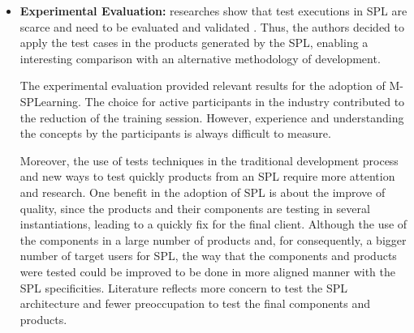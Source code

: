\begin{itemize}
\item \textbf{Experimental Evaluation:} researches show that test executions in SPL are scarce and need to be evaluated and validated \cite{engstrom11}. Thus, the authors decided to apply the test cases in the products generated by the SPL, enabling a interesting comparison with an alternative methodology of development.

The experimental evaluation provided relevant results for the adoption of M-SPLear\allowbreak ning. The choice for active participants in the industry contributed to the reduction of the training session. However, experience and understanding the concepts by the participants is always difficult to measure.

Moreover, the use of tests techniques in the traditional development process and new ways to test quickly products from an SPL require more attention and research. One benefit in the adoption of SPL is about the improve of quality, since the products and their components are testing in several instantiations, leading to a quickly fix for the final client. Although the use of the components in a large number of products and, for consequently, a bigger number of target users for SPL, the way that the components and products were tested could be improved to be done in more aligned manner with the SPL specificities. Literature reflects more concern to test the SPL architecture and fewer preoccupation to test the final components and products.
\end{itemize}